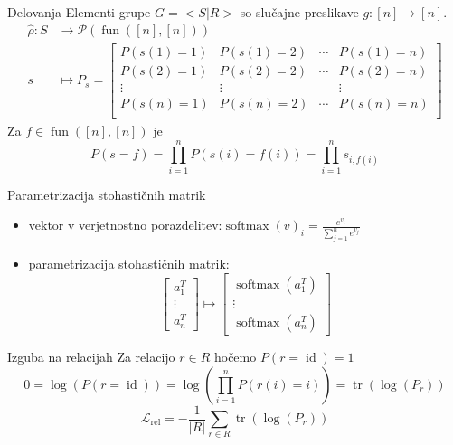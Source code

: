 \begin{frame}{\color{aoblue}Delovanja}
  Elementi grupe $G=<S|R>$ so slučajne preslikave $g \colon [n] \to [n]$.
  \begin{align*}
    \hat \rho \colon S &\to \mathcal{P}(\operatorname{fun}([n],[n])) \\
    s &\mapsto P_s =
    \begin{bmatrix}
      P(s(1) = 1) & P(s(1) = 2) & \dotsm & P(s(1) = n) \\
      P(s(2) = 1) & P(s(2) = 2) & \dotsm & P(s(2) = n) \\
      \vdots & \vdots & & \vdots \\
      P(s(n) = 1) & P(s(n) = 2) & \dotsm & P(s(n) = n) \\
    \end{bmatrix}
  \end{align*}
  Za $f \in \operatorname{fun}([n],[n])$ je
  $$P(s = f) = \prod \limits_{i=1}^n P(s(i) = f(i)) = \prod
  \limits_{i=1}^n s_{i, f(i)}$$
\end{frame}
\begin{frame}{Parametrizacija stohastičnih matrik}
  \begin{itemize}
    \item vektor v verjetnostno
      porazdelitev:$\operatorname{softmax}(v)_i =
      \frac{e^{v_i}}{\sum_{j=1}^n e^{v_j}}$
    \item parametrizacija stohastičnih matrik:
      $$
      \begin{bmatrix}
        a_1^T \\
        \vdots \\
        a_n^T
      \end{bmatrix} \mapsto
      \begin{bmatrix}
        \operatorname{softmax}(a_1^T) \\
        \vdots \\
        \operatorname{softmax}(a_n^T)
      \end{bmatrix}
      $$
  \end{itemize}
\end{frame}
\begin{frame}{\color{aoblue} Izguba na relacijah}
  Za relacijo $r \in R$ hočemo $P(r=\operatorname{id}) = 1$
  $$
  0 = \log(P(r=\operatorname{id})) = \log(\prod_{i=1}^n P(r(i)=i)) =
  \operatorname{tr}(\log(P_r))
  $$
  $$
  \mathcal{L}_{\text{rel}}  = - \frac{1}{|R|} \sum_{r \in R}
  \operatorname{tr}(\log(P_r))
  $$
\end{frame}

